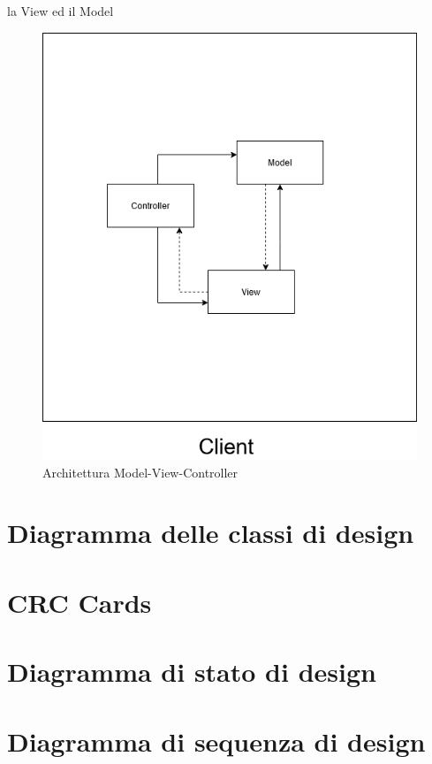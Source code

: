 la View ed il Model
\begin{center}
    \begin{figure}[H]
        \includegraphics[width=\textwidth]{Figures/MVC client.png}
        \caption{Architettura Model-View-Controller}
    \end{figure}
\end{center}
\section{Diagramma delle classi di design}

\section{CRC  Cards}

\section{Diagramma di stato di design}

\section{Diagramma di sequenza di design}